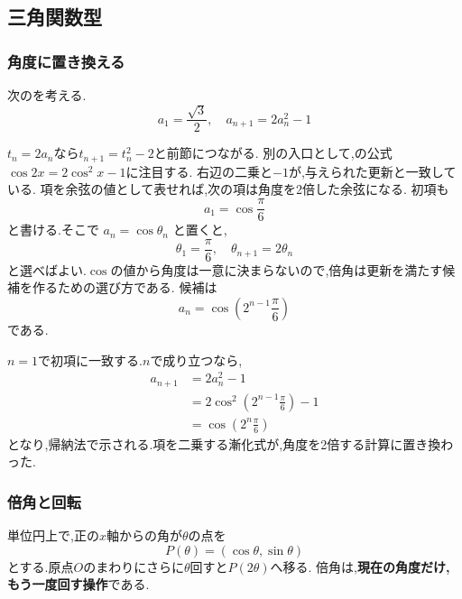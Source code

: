 \subsection{三角関数型}\label{節：三角関数型}
  \subsubsection{角度に置き換える}\label{節：解法}
    次のを考える.
    \[
      a_1=\frac{\sqrt{3}}{2},\quad a_{n+1}=2a_n^2-1
    \]

    $t_n=2a_n$なら$t_{n+1}=t_n^2-2$と前節につながる.
    別の入口として,の公式$\cos2x=2\cos^2x-1$に注目する.
    右辺の二乗と$-1$が,与えられた更新と一致している.
    項を余弦の値として表せれば,次の項は角度を2倍した余弦になる.
    初項も
    \[
      a_1=\cos\frac{\pi}{6}
    \]
    と書ける.そこで $a_n=\cos\theta_n$ と置くと,
    \[
      \theta_1=\frac{\pi}{6},
      \quad
      \theta_{n+1}=2\theta_n
    \]
    と選べばよい.$\cos$の値から角度は一意に決まらないので,倍角は更新を満たす候補を作るための選び方である.
    候補は
    \[
      a_n=\cos\left(2^{n-1}\frac{\pi}{6}\right)
    \]
    である.

    $n=1$で初項に一致する.$n$で成り立つなら,
    \begin{align*}
      a_{n+1}
        &=2a_n^2-1\\
        &=2\cos^2\left(2^{n-1}\frac{\pi}{6}\right)-1\\
        &=\cos\left(2^n\frac{\pi}{6}\right)
    \end{align*}
    となり,帰納法で示される.項を二乗する漸化式が,角度を2倍する計算に置き換わった.

  \subsubsection{倍角と回転}\label{節：倍角を回転として見る}
    単位円上で,正の$x$軸からの角が$\theta$の点を
    \[
      P(\theta)=(\cos\theta,\sin\theta)
    \]
    とする.原点$O$のまわりにさらに$\theta$回すと$P(2\theta)$へ移る.
    倍角は,\textbf{現在の角度だけ,もう一度回す操作}である.

    \begin{center}
    \end{center}

